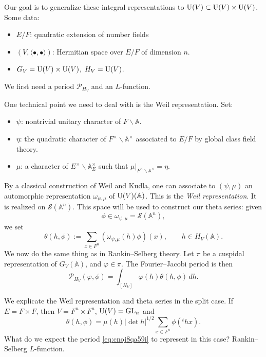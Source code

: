 \documentclass[reqno]{amsart} 
\begin{document}
Our goal is to generalize these integral representations to $\operatorname{U}(V) \subset \operatorname{U}(V) \times \operatorname{U}(V)$.  Some data:
\begin{itemize}
\item $E/F$: quadratic extension of number fields
\item $(V, \langle \bullet, \bullet \rangle)$: Hermitian space over $E/F$ of dimension $n$.
\item $G_V = \operatorname{U}(V) \times \operatorname{U}(V)$, $H_V = \operatorname{U}(V)$.
\end{itemize}
We first need a period $\mathcal{P}_{H_V}$ and an $L$-function.

One technical point we need to deal with is the Weil representation.  Set:
\begin{itemize}
\item $\psi$: nontrivial unitary character of $F \backslash \mathbb{A}$.
\item $\eta$: the quadratic character of $F^\times \backslash \mathbb{A}^\times$ associated to $E/F$ by global class field theory.
\item $\mu$: a character of $E^\times \backslash \mathbb{A}_E^\times$ such that $\mu |_{F^\times \backslash \mathbb{A}^\times} = \eta$.
\end{itemize}
By a classical construction of Weil and Kudla, one can associate to $(\psi, \mu)$ an automorphic representation $\omega_{\psi, \mu}$ of $\operatorname{U}(V)(\mathbb{A})$.  This is the \emph{Weil representation}.  It is realized on $\mathcal{S}(\mathbb{A}^n)$.  This space will be used to construct our theta series: given
\begin{equation*}
  \phi \in \omega_{\psi, \mu} = \mathcal{S}(\mathbb{A}^n),
\end{equation*}
we set
\begin{equation*}
  \theta(h, \phi) := \sum_{x \in F^n} \left( \omega_{\psi, \mu}(h) \phi \right)(x),
  \qquad
  h \in H_V(\mathbb{A}).
\end{equation*}
We now do the same thing as in Rankin--Selberg theory.  Let $\pi$ be a cuspidal representation of $G_V(\mathbb{A})$, and $\varphi \in \pi$.  The Fourier--Jacobi period is then
\begin{equation}\label{eq:cnoj8qa59i}
  \mathcal{P}_{H_V}(\varphi, \phi) = \int_{[H_V]} \varphi(h) \theta(h, \phi) \, d h.
\end{equation}

\begin{remark}
  We explicate the Weil representation and theta series in the split case.  If $E = F \times F$, then $V = F^n \times F^n$, $\operatorname{U}(V) = \operatorname{GL}_n$ and
  \begin{equation*}
    \theta(h, \phi) = \mu(h) \lvert \det h \rvert^{1/2} \sum_{x \in F^n}
    \phi({}^t h x).
  \end{equation*}
  What do we expect the period \eqref{eq:cnoj8qa59i} to represent in this case?  Rankin--Selberg $L$-function.
\end{remark}
\end{document}

